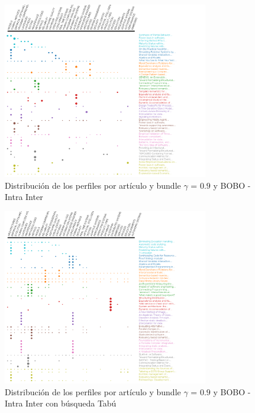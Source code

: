 \begin{figure}[H]
  \centering
    \includegraphics[width=0.8\textwidth]{resultados/papers/BOBO/INTRA_INTER/gamma-09.png}
  \caption{Distribución de los perfiles por artículo y bundle $\gamma$ = $0.9$ y BOBO - Intra Inter}
  \label{res:img-papers-gamma09-bobo-intra-inter}
\end{figure}

\begin{figure}[H]
  \centering
    \includegraphics[width=0.8\textwidth]{resultados/papers/BOBO/INTRA_INTER/gamma-with-local-09.png}
  \caption{Distribución de los perfiles por artículo y bundle $\gamma$ = $0.9$ y BOBO - Intra Inter con búsqueda Tabú}
  \label{res:img-papers-gamma09-bobo-intra-inter-tabu}
\end{figure}

